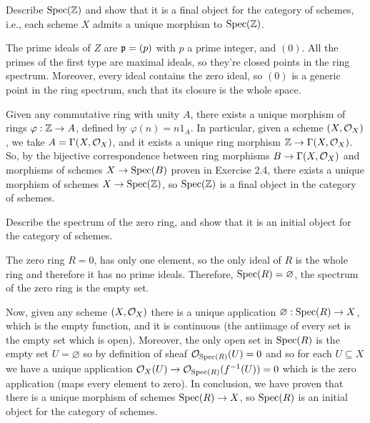 \begin{ex}
	Describe $\mathrm{Spec}(\mathbb{Z})$ and show that it is a final object for the category of schemes, i.e., each scheme $X$ admits a unique morphism to $\mathrm{Spec}(\mathbb{Z})$.
\end{ex}

\begin{sol}
	The prime ideals of $Z$ are $\mathfrak{p} = (p)$ with $p$ a prime integer, and $(0)$. All the primes of the first type are maximal ideals, so they're closed points in the ring spectrum. Moreover, every ideal contains the zero ideal, so $(0)$ is a generic point in the ring spectrum, such that its closure is the whole space.

	Given any commutative ring with unity $A$, there exists a unique morphism of rings $\varphi: \mathbb{Z} \to A$, defined by $\varphi(n) = n 1_{A}$. In particular, given a scheme $(X, \mathcal{O}_X)$, we take $A = \Gamma(X,\mathcal{O}_X)$, and it exists a unique ring morphism $\mathbb{Z} \to \Gamma(X, \mathcal{O}_X)$. So, by the bijective correspondence between ring morphisms $B \to \Gamma(X, \mathcal{O}_X)$ and morphisms of schemes $X \to \mathrm{Spec}(B)$ proven in Exercise 2.4, there exists a unique morphism of schemes $X \to \mathrm{Spec}(\mathbb{Z})$, so $\mathrm{Spec}(\mathbb{Z})$ is a final object in the category of schemes.
\end{sol}

\begin{ex}
	Describe the spectrum of the zero ring, and show that it is an initial object for the category of schemes. 
\end{ex}

\begin{sol}
	The zero ring $R = 0$, has only one element, so the only ideal of $R$ is the whole ring and therefore it has no prime ideals. Therefore, $\mathrm{Spec}(R) = \varnothing$, the spectrum of the zero ring is the empty set. 

	Now, given any scheme $(X,\mathcal{O}_X)$ there is a unique application $\varnothing: \mathrm{Spec}(R) \to X$, which is the empty function, and it is continuous (the antiimage of every set is the empty set which is open). Moreover, the only open set in $\mathrm{Spec}(R)$ is the empty set $U = \varnothing$ so by definition of sheaf $\mathcal{O}_{\mathrm{Spec}(R)}(U) = 0$ and so for each $U \subseteq X$ we have a unique application $\mathcal{O}_X(U) \to \mathcal{O}_{\mathrm{Spec}(R)}(f^{-1}(U)) = 0$ which is the zero application (maps every element to zero). In conclusion, we have proven that there is a unique morphism of schemes $\mathrm{Spec}(R) \to X$, so $\mathrm{Spec}(R)$ is an initial object for the category of schemes.
\end{sol}

